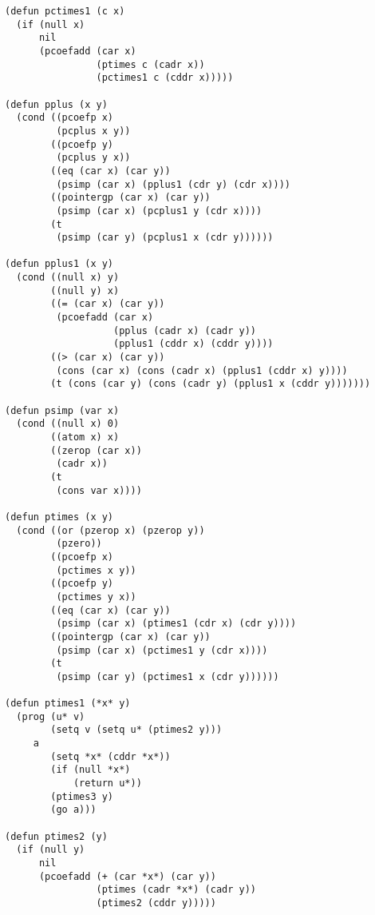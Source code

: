 \documentclass{amsart}
\begin{document}
\begin{verbatim}
(defun pctimes1 (c x)
  (if (null x)
      nil
      (pcoefadd (car x)
                (ptimes c (cadr x))
                (pctimes1 c (cddr x)))))

(defun pplus (x y) 
  (cond ((pcoefp x)
         (pcplus x y))
        ((pcoefp y)
         (pcplus y x))
        ((eq (car x) (car y))
         (psimp (car x) (pplus1 (cdr y) (cdr x))))
        ((pointergp (car x) (car y))
         (psimp (car x) (pcplus1 y (cdr x))))
        (t
         (psimp (car y) (pcplus1 x (cdr y))))))

(defun pplus1 (x y)
  (cond ((null x) y)
        ((null y) x)
        ((= (car x) (car y))
         (pcoefadd (car x)
                   (pplus (cadr x) (cadr y))
                   (pplus1 (cddr x) (cddr y))))
        ((> (car x) (car y))
         (cons (car x) (cons (cadr x) (pplus1 (cddr x) y))))
        (t (cons (car y) (cons (cadr y) (pplus1 x (cddr y)))))))

(defun psimp (var x)
  (cond ((null x) 0)
        ((atom x) x)
        ((zerop (car x))
         (cadr x))
        (t
         (cons var x))))

(defun ptimes (x y) 
  (cond ((or (pzerop x) (pzerop y))
         (pzero))
        ((pcoefp x)
         (pctimes x y))
        ((pcoefp y)
         (pctimes y x))
        ((eq (car x) (car y))
         (psimp (car x) (ptimes1 (cdr x) (cdr y))))
        ((pointergp (car x) (car y))
         (psimp (car x) (pctimes1 y (cdr x))))
        (t
         (psimp (car y) (pctimes1 x (cdr y))))))

(defun ptimes1 (*x* y) 
  (prog (u* v)
        (setq v (setq u* (ptimes2 y)))
     a  
        (setq *x* (cddr *x*))
        (if (null *x*)
            (return u*))
        (ptimes3 y)
        (go a)))

(defun ptimes2 (y)
  (if (null y)
      nil
      (pcoefadd (+ (car *x*) (car y))
                (ptimes (cadr *x*) (cadr y))
                (ptimes2 (cddr y)))))


\end{verbatim}
\end{document}
